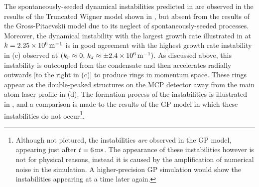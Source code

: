 The spontaneously-seeded dynamical instabilities predicted in  are observed in the results of the Truncated Wigner model shown in , but absent from the results of the Gross-Pitaevskii model due to its neglect of spontaneously-seeded processes. Moreover, the dynamical instability with the largest growth rate illustrated in  at $k=\unit[2.25\times 10^6]{m}^{-1}$ is in good agreement with the highest growth rate instability in (c) observed at $(k_r \approx 0,\, k_z \approx \pm\unit[2.4\times 10^6]{m}^{-1})$. As discussed above, this instability is outcoupled from the condensate and then accelerates radially outwards [to the right in (c)] to produce rings in momentum space. These rings appear as the double-peaked structures on the MCP detector away from the main atom laser profile in (d). The formation process of the instabilities is illustrated in , and a comparison is made to the results of the GP model in which these instabilities do not occur\footnote{Although not pictured, the instabilities \emph{are} observed in the GP model, appearing just after $t=\unit[6]{ms}$. The appearance of these instabilities however is not for physical reasons, instead it is caused by the amplification of numerical noise in the simulation. A higher-precision GP simulation would show the instabilities appearing at a time later again.}.

